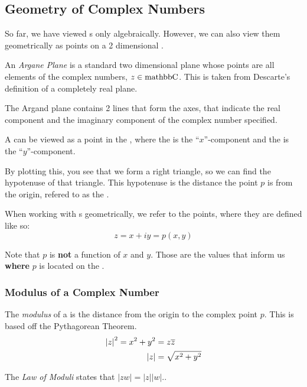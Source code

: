 \subsection{Geometry of Complex Numbers}\label{subsec:Geometry_Complex_Numbers}
So far, we have viewed s only algebraically.
However, we can also view them geometrically as points on a 2 dimensional .

\begin{definition}\label{def:Argand_Plane}
  An \emph{Argane Plane} is a standard two dimensional plane whose points are all elements of the complex numbers, $z \in \operatorname{mathbb{C}}$.
  This is taken from Descarte's definition of a completely real plane.

  The Argand plane contains 2 lines that form the axes, that indicate the real component and the imaginary component of the complex number specified.
\end{definition}

A  can be viewed as a point in the , where the  is the ``$x$''-component and the  is the ``$y$''-component.

By plotting this, you see that we form a right triangle, so we can find the hypotenuse of that triangle.
This hypotenuse is the distance the point $p$ is from the origin, refered to as the .
\begin{remark*}
  When working with s geometrically, we refer to the points, where they are defined like so:
  \begin{equation*}
    z = x + iy = p(x, y)
  \end{equation*}

  Note that $p$ is \textbf{not} a function of $x$ and $y$.
  Those are the values that inform us \textbf{where} $p$ is located on the .
\end{remark*}

\subsubsection{Modulus of a Complex Number}\label{subsubsec:Complex_Number_Modulus}
\begin{definition}[Modulus]\label{def:Complex_Number_Modulus}
  The \emph{modulus} of a  is the distance from the origin to the complex point $p$.
  This is based off the Pythagorean Theorem.
  \begin{equation}\label{eq:Complex_Number_Modulus}
    \begin{aligned}
      {\lvert z \rvert}^{2} = x^{2} + y^{2} &= z \overline{z} \\
      \lvert z \rvert &= \sqrt{x^{2} + y^{2}}
    \end{aligned}
  \end{equation}
\end{definition}

\begin{propertylist}
\item The \emph{Law of Moduli} states that $\lvert z w \rvert = \lvert z \rvert \lvert w \rvert$.\label{prop:Law_of_Moduli}.
\end{propertylist}


